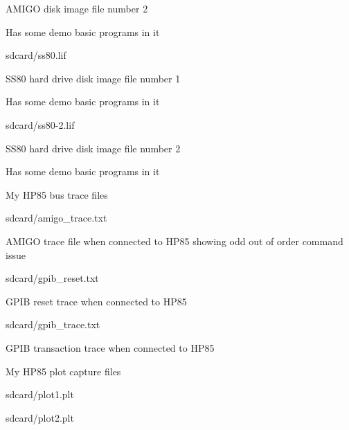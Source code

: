 \begin{DoxyItemize}
\begin{DoxyItemize}
\begin{DoxyItemize}
\begin{DoxyItemize}
\item A\+M\+I\+GO disk image file number 2
\item Has some demo basic programs in it
\end{DoxyItemize}
\item sdcard/ss80.\+lif
\begin{DoxyItemize}
\item S\+S80 hard drive disk image file number 1
\item Has some demo basic programs in it
\end{DoxyItemize}
\item sdcard/ss80-\/2.\+lif
\begin{DoxyItemize}
\item S\+S80 hard drive disk image file number 2
\item Has some demo basic programs in it
\end{DoxyItemize}
\end{DoxyItemize}
\item My H\+P85 bus trace files
\begin{DoxyItemize}
\item sdcard/amigo\+\_\+trace.\+txt
\begin{DoxyItemize}
\item A\+M\+I\+GO trace file when connected to H\+P85 showing odd out of order command issue
\end{DoxyItemize}
\item sdcard/gpib\+\_\+reset.\+txt
\begin{DoxyItemize}
\item G\+P\+IB reset trace when connected to H\+P85
\end{DoxyItemize}
\item sdcard/gpib\+\_\+trace.\+txt
\begin{DoxyItemize}
\item G\+P\+IB transaction trace when connected to H\+P85
\end{DoxyItemize}
\end{DoxyItemize}
\item My H\+P85 plot capture files
\begin{DoxyItemize}
\item sdcard/plot1.\+plt
\item sdcard/plot2.\+plt 

 
\end{DoxyItemize}
\end{DoxyItemize}
\end{DoxyItemize}